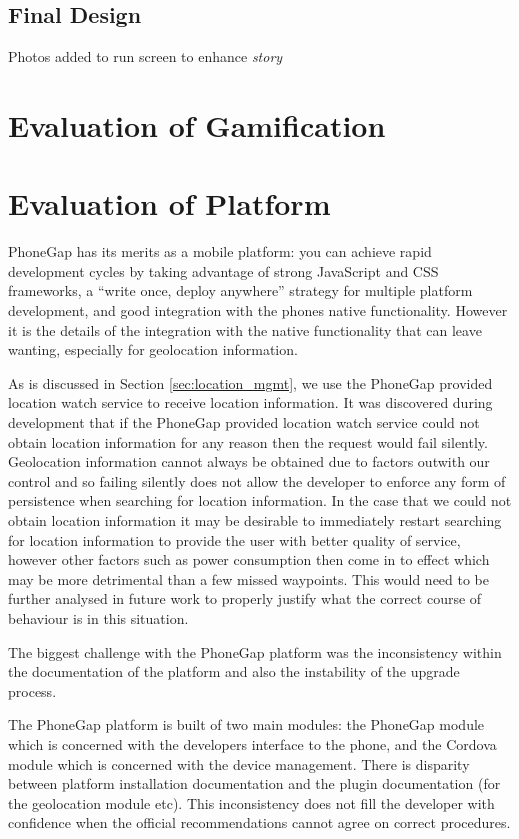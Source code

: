 \subsection{Final Design}
\label{sec:final_design}
Photos added to run screen to enhance \emph{story}


\section{Evaluation of Gamification}

\section{Evaluation of Platform}
PhoneGap has its merits as a mobile platform: you can achieve rapid
development cycles by taking advantage of strong JavaScript and CSS
frameworks, a ``write once, deploy anywhere'' strategy for multiple
platform development, and good integration with the phones native
functionality. However it is the details of the integration with the
native functionality that can leave wanting, especially for
geolocation information.

As is discussed in Section \ref{sec:location_mgmt}, we use the PhoneGap
provided location watch service to receive location information. It
was discovered during development that if the PhoneGap provided
location watch service could not obtain location information for any
reason then the request would fail silently. Geolocation information
cannot always be obtained due to factors outwith our control and so
failing silently does not allow the developer to enforce any form of
persistence when searching for location information. In the case that
we could not obtain location information it may be desirable to
immediately restart searching for location information to provide the
user with better quality of service, however other factors such as
power consumption then come in to effect which may be more detrimental
than a few missed waypoints. This would need to be further analysed in
future work to properly justify what the correct course of behaviour
is in this situation.

The biggest challenge with the PhoneGap platform was the inconsistency
within the documentation of the platform and also the instability of
the upgrade process. 

The PhoneGap platform is built of two main modules: the PhoneGap
module which is concerned with the developers interface to the phone,
and the Cordova module which is concerned with the device management.
There is disparity between platform installation documentation and the
plugin documentation (for the geolocation module
etc)\cite{phonegap_install, phonegap_cli,
  phonegap_geolocationAccessingFeature}. This inconsistency does not
fill the developer with confidence when the official recommendations
cannot agree on correct procedures. 

